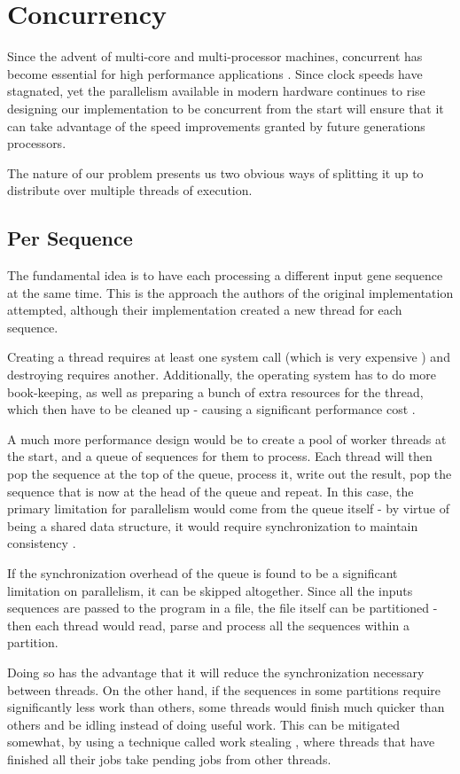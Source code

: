 \documentclass[a4paper,12pt]{report}
\begin{document}
\section{Concurrency}
Since the advent of multi-core and multi-processor machines, concurrent has become essential for high performance applications \autocite{freelunch}. Since clock speeds have stagnated, yet the parallelism available in modern hardware continues to rise designing our implementation to be concurrent from the start will ensure that it can take advantage of the speed improvements granted by future generations processors.

The nature of our problem presents us two obvious ways of splitting it up to distribute over multiple threads of execution.

\subsection{Per Sequence}
 The fundamental idea is to have each processing a different input gene sequence at the same time. This is the approach the authors of the original implementation attempted, although their implementation created a new thread for each sequence.

 Creating a thread requires at least one system call (which is very expensive \autocite{syscalls}) and destroying requires another. Additionally, the operating system has to do more book-keeping, as well as preparing a bunch of extra resources for the thread, which then have to be cleaned up - causing a significant performance cost \autocite{threads}.

 A much more performance design would be to create a pool of worker threads at the start, and a queue of sequences for them to process. Each thread will then pop the sequence at the top of the queue, process it, write out the result, pop the sequence that is now at the head of the queue and repeat. In this case, the primary limitation for parallelism would come from the queue itself - by virtue of being a shared data structure, it would require synchronization to maintain consistency \autocite{concurrency}.

 If the synchronization overhead of the queue is found to be a significant limitation on parallelism, it can be skipped altogether. Since all the inputs sequences are passed to the program in a file, the file itself can be partitioned - then each thread would read, parse and process all the sequences within a partition.

 Doing so has the advantage that it will reduce the synchronization necessary between threads. On the other hand, if the sequences in some partitions require significantly less work than others, some threads would finish much quicker than others and be idling instead of doing useful work. This can be mitigated somewhat, by using a technique called work stealing \autocite{workstealing}, where threads that have finished all their jobs take pending jobs from other threads.
\end{document}

